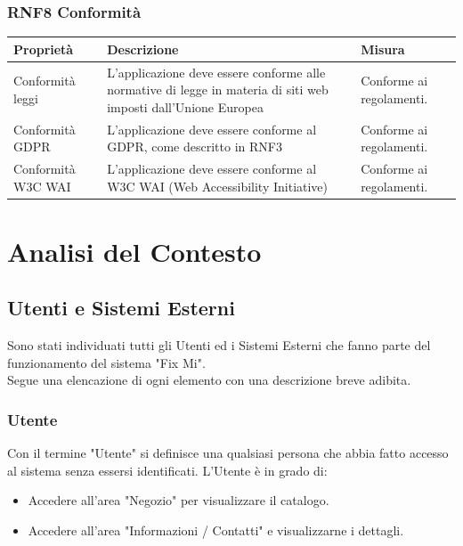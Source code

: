 \documentclass{report}
\begin{document}
\subsection*{RNF8 Conformità}
\begin{center} %
	\centering
	\begin{tabular}{ |p{3cm}|p{4cm}|p{4cm}|  }
		\hline
		\centering Proprietà & \qquad\quad Descrizione & \qquad\qquad Misura\\ %
		\hline
		Conformità leggi & L'applicazione deve essere conforme alle normative di legge in materia di siti web imposti dall'Unione Europea & Conforme ai regolamenti. \\
		\hline
		Conformità GDPR & L'applicazione deve essere conforme al GDPR, come descritto in RNF3 & Conforme ai regolamenti.\\
		\hline
		Conformità W3C WAI & L'applicazione deve essere conforme al W3C WAI (Web Accessibility Initiative) & Conforme ai regolamenti.\\ 
		\hline
	\end{tabular}

\end{center}


\chapter{Analisi del Contesto}

\section{Utenti e Sistemi Esterni}

Sono stati individuati tutti gli Utenti ed i Sistemi Esterni che fanno parte del funzionamento del sistema "Fix Mi".\\Segue una elencazione di ogni elemento con una descrizione breve adibita.


\subsection*{Utente}
Con il termine "Utente" si definisce una qualsiasi persona che abbia fatto accesso al sistema senza essersi identificati. L'Utente è in grado di:
\begin{itemize}
	\item Accedere all'area "Negozio" per visualizzare il catalogo.
	\item Accedere all'area "Informazioni / Contatti" e visualizzarne i dettagli. 
\end{itemize}
\end{document}
